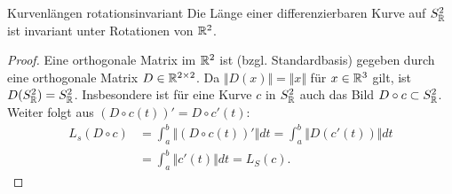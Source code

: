 \begin{lemma}{Kurvenlängen rotationsinvariant}
  \label{lemma:kurvenlaengen}
  Die Länge einer differenzierbaren Kurve auf $ S^2_{\mathbb{R}} $ ist invariant unter Rotationen von $ \mathbb{R}^2 $.
  \begin{proof}
    Eine orthogonale Matrix im $ \mathbb{R}^2 $ ist (bzgl. Standardbasis) gegeben durch eine orthogonale Matrix $ D \in \mathbb{R}^{2 \times 2} $. Da $ \Vert D(x) \Vert = \Vert x \Vert $ für $ x \in \mathbb{R}^3 $ gilt, ist $ D(S^2_{\mathbb{R}}) = S^2_{\mathbb{R}} $. Insbesondere ist für eine Kurve $ c $ in $ S^2_{\mathbb{R}} $ auch das Bild $ D \circ c \subset S^2_{\mathbb{R}} $. \\
    Weiter folgt aus $ (D \circ c(t))' = D \circ c'(t) $:
    \begin{align*}
      L_s(D \circ c) &= \int_a^b \Vert (D \circ c(t))' \Vert dt = \int_a^b \Vert D(c'(t)) \Vert dt \\
        &= \int_a^b \Vert c'(t) \Vert dt = L_S(c)\text{.}
    \end{align*}
  \end{proof}
\end{lemma}

